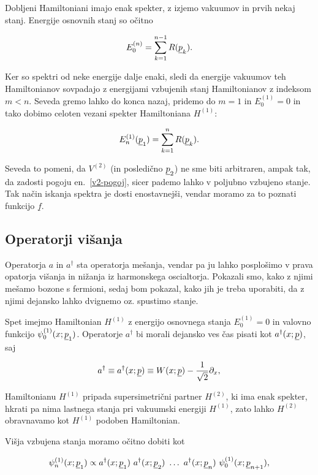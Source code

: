 \ni Dobljeni Hamiltoniani imajo enak spekter, z izjemo vakuumov in prvih nekaj stanj. Energije 
osnovnih stanj so o\v citno

\begin{equation}
	E^{(n)}_0 = \sum_{k = 1}^{n - 1} R(\underline{p}_k).
\end{equation}

Ker so spektri od neke energije dalje enaki, sledi da energije vakuumov teh Hamiltonianov sovpadajo z energijami
vzbujenih stanj Hamiltonianov z indeksom $m < n$. Seveda gremo lahko do konca nazaj, pridemo do
$m = 1$ in $E^{(1)}_0 = 0$ in tako dobimo celoten vezani spekter Hamiltoniana $H^{(1)}$:

\begin{equation}
	E_n^{(1)} (\underline{p}_1) = \sum_{k = 1}^n R (\underline{p}_k).
	\label{v2-pogoj}
\end{equation}

\ni Seveda to pomeni, da $V^{(2)}$ (in posledi\v cno $\underline{p}_2$) ne sme biti arbitraren, ampak tak, da zadosti pogoju
en.~\eqref{v2-pogoj}, sicer pademo lahko v poljubno vzbujeno stanje. Tak na\v cin iskanja spektra je dosti
enostavnej\v si, vendar moramo za to poznati funkcijo $\underline{f}$. 

\subsection{Operatorji vi\v sanja}

Operatorja $a$ in $a^\dagger$ sta operatorja me\v sanja, vendar pa ju lahko posplo\v simo v prava opatorja vi\v sanja in ni\v zanja
iz harmonskega
oscialtorja. Pokazali smo, kako z njimi me\v samo bozone s fermioni, sedaj bom pokazal, kako jih
je treba uporabiti, da z njimi dejansko lahko dvignemo oz. spustimo stanje.

Spet imejmo Hamiltonian $H^{(1)}$ z energijo osnovnega stanja $E^{(1)}_0 = 0$ in valovno funkcijo
$\psi_0^{(1)} (x; \underline{p}_1)$. Operatorje $a^\dagger$ bi morali dejansko ves \v cas pisati kot $a^\dagger (x; \underline{p})$,
saj

\[
	a^\dagger \equiv a^\dagger (x; \underline{p}) \equiv W(x; \underline{p}) - \frac{1}{\sqrt{2}}\partial_x,
\]

Hamiltonianu $H^{(1)}$ pripada supersimetri\v cni partner $H^{(2)}$, ki ima enak spekter, hkrati pa nima lastnega
stanja pri vakuumski energiji $H^{(1)}$, zato lahko $H^{(2)}$ obravnavamo kot $H^{(1)}$ podoben Hamiltonian.

Vi\v sja vzbujena stanja moramo o\v citno dobiti kot

\begin{equation}
	\psi^{(1)}_n (x; \underline{p}_1) \propto a^\dagger (x;\underline{p}_1)\ a^\dagger (x;\underline{p}_2)\ \ldots\ a^\dagger (x; \underline{p}_n)\
		\psi^{(1)}_0 (x; \underline{p}_{n+1}),
\end{equation}

